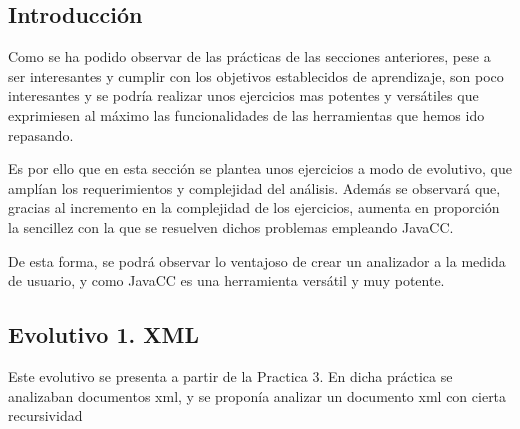 \subsection{Introducción}

\noindent Como se ha podido observar de las prácticas de las secciones anteriores, pese a ser interesantes y cumplir con los objetivos establecidos de aprendizaje, son poco interesantes y se podría realizar unos ejercicios mas potentes y versátiles que exprimiesen al máximo las funcionalidades de las herramientas que hemos ido repasando.

Es por ello que en esta sección se plantea unos ejercicios a modo de evolutivo, que amplían los requerimientos y complejidad del análisis. Además se observará que, gracias al incremento en la complejidad de los ejercicios, aumenta en proporción la sencillez con la que se resuelven dichos problemas empleando JavaCC.

De esta forma, se podrá observar lo ventajoso de crear un analizador a la medida de usuario, y como JavaCC es una herramienta versátil y muy potente.

\subsection{Evolutivo 1. XML}

\noindent Este evolutivo se presenta a partir de la Practica 3. En dicha práctica se analizaban documentos xml, y se proponía analizar un documento xml con cierta recursividad